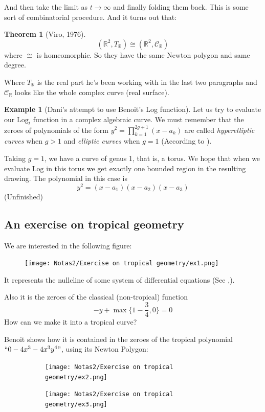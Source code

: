 \documentclass{article}
\theoremstyle{definition}
\newtheorem*{thm*}{Theorem}
\newtheorem{ex}{Example}
\newcommand{\R}{\mathbb{R}}
\newcommand{\Log}{\text{Log}}
\begin{document}
And then take the limit as $t\to\infty$ and finally folding them back. This is some sort of combinatorial procedure. And it turns out that:
\begin{thm*}[Viro, 1976]
	$$(\R^2,T_\R)\cong(\R^2,\mathcal C_\R)$$
	where $\cong$ is homeomorphic. So they have the same Newton polygon and same degree.
\end{thm*}
Where $T_\R$ is the real part he's been working with in the last two paragraphs and $\mathcal C_\R$ looks like the whole complex curve (real surface).
\begin{ex}[Dani's attempt to use Benoit's Log function]
	Let us try to evaluate our $\Log_t$ function in a complex algebraic curve. We must remember that the zeroes of polynomials of the form $y^2=\prod_{k=1}^{2g+1}(x-a_k)$ are called \textit{hyperelliptic curves} when $g>1$ and \textit{elliptic curves} when $g=1$ (According to \cite{diez}).\par
	Taking $g=1$, we have a curve of genus 1, that is, a torus. We hope that when we evaluate $\Log$ in this torus we get exactly one bounded region in the resulting drawing. The polynomial in this case is 
	$$y^2=(x-a_1)(x-a_2) (x-a_3)
	$$\hfill(Unfinished)\par
\end{ex}
\subsection{An exercise on tropical geometry}
 We are interested in the following figure:
 \begin{figure}[H]
		\centering
		\texttt{[image: Notas2/Exercise on tropical geometry/ex1.png]}
		\label{ex1}
	\end{figure}
 It represents the nullcline of some system of differential equations (See \cite{curto2},\cite{curto1}).\par
 Also it is the zeroes of the classical (non-tropical) function
	$$
	-y+\max\{1-\frac{3}{4},0\}=0
	$$
	How can we make it into a tropical curve?
	

	Benoit shows how it is contained in the zeroes of the tropical polynomial $``0-4x^3-4x^3y^4"$, using its Newton Polygon:
	
	\begin{figure}[H]
		
		\begin{subfigure}{0.5\textwidth}
				\centering
				\texttt{[image: Notas2/Exercise on tropical geometry/ex2.png]}
				\label{ex2}
		\end{subfigure}
		\begin{subfigure}{0.5\textwidth}
			\centering
			\texttt{[image: Notas2/Exercise on tropical geometry/ex3.png]}
			\label{ex3}
		\end{subfigure}
	\end{figure}
\end{document}
